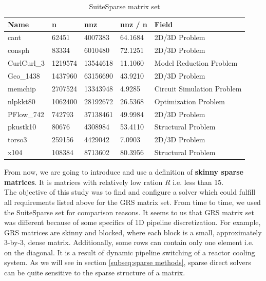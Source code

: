 \begin{table}[ht]
\centering
\begin{tabular}{|l|l|l|l|l|}
\hline
Name        & n       & nnz      & nnz / n & Field                      \\ \hline
cant        & 62451   & 4007383  & 64.1684 & 2D/3D Problem              \\ \hline
consph      & 83334   & 6010480  & 72.1251 & 2D/3D Problem              \\ \hline
CurlCurl\_3 & 1219574 & 13544618 & 11.1060 & Model Reduction Problem    \\ \hline
Geo\_1438   & 1437960 & 63156690 & 43.9210 & 2D/3D Problem              \\ \hline
memchip     & 2707524 & 13343948 & 4.9285  & Circuit Simulation Problem \\ \hline
nlpkkt80    & 1062400 & 28192672 & 26.5368 & Optimization Problem       \\ \hline
PFlow\_742  & 742793  & 37138461 & 49.9984 & 2D/3D Problem              \\ \hline
pkustk10    & 80676   & 4308984  & 53.4110 & Structural Problem         \\ \hline
torso3      & 259156  & 4429042  & 7.0903  & 2D/3D Problem              \\ \hline
x104        & 108384  & 8713602  & 80.3956 & Structural Problem         \\ \hline
\end{tabular}
\caption{SuiteSparse matrix set}
\label{table:suite-sparse-matrix-set}
\end{table}


From now, we are going to introduce and use a definition of \textbf{skinny sparse matrices}. It is matrices with relatively low  ration $R$ i.e. less than 15. \\ 


The objective of this study was to find and configure a solver which could fulfill all requirements listed above for the GRS matrix set. From time to time, we used the SuiteSparse set for comparison reasons. It seems to us that GRS matrix set was different because of some specifics of 1D pipeline discretization. For example, GRS matrices are skinny and blocked, where each block is a small, approximately 3-by-3, dense matrix. Additionally, some rows can contain only one element i.e. on the diagonal. It is a result of dynamic pipeline switching of a reactor cooling system. As we will see in section \ref{subseq:sparse methods}, sparse direct solvers can be quite sensitive to the sparse structure of a matrix.\\


